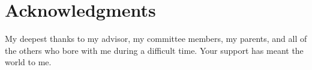\chapter*{Acknowledgments}

My deepest thanks to my advisor, my committee members, my parents, and all of the others who bore with me during a difficult time. Your support has meant the world to me.